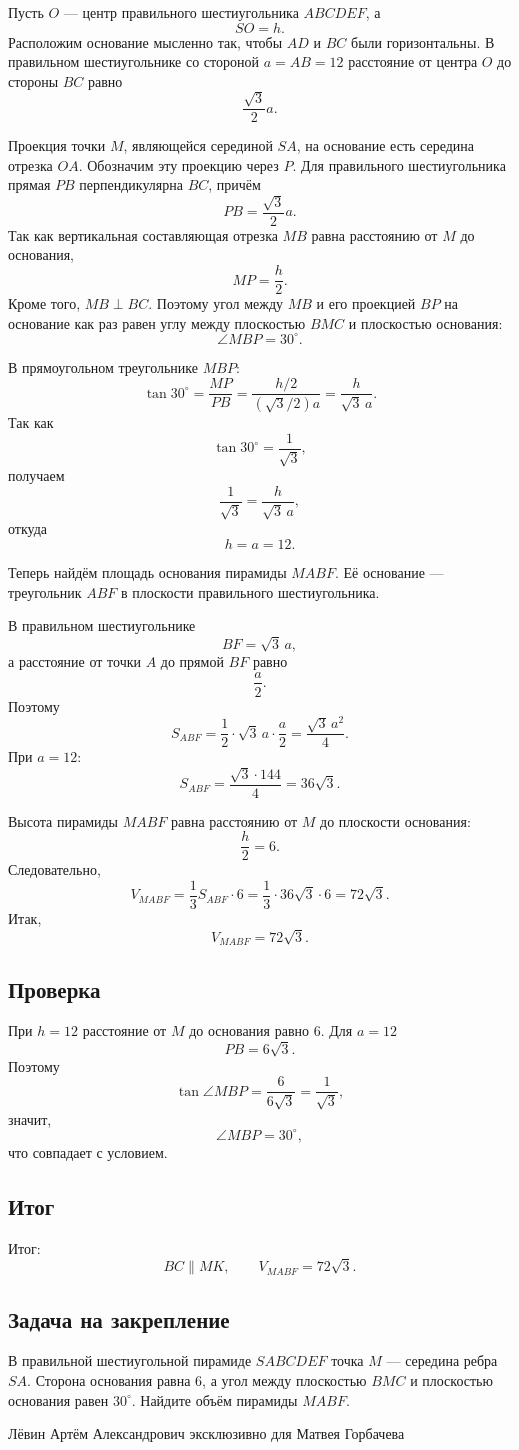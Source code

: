 \documentclass[12pt,a4paper]{article}
\begin{document}
Пусть $O$ --- центр правильного шестиугольника $ABCDEF$, а
\[
SO=h.
\]
Расположим основание мысленно так, чтобы $AD$ и $BC$ были горизонтальны. В правильном шестиугольнике со стороной $a=AB=12$ расстояние от центра $O$ до стороны $BC$ равно
\[
\frac{\sqrt3}{2}a.
\]

Проекция точки $M$, являющейся серединой $SA$, на основание есть середина отрезка $OA$. Обозначим эту проекцию через $P$. Для правильного шестиугольника прямая $PB$ перпендикулярна $BC$, причём
\[
PB=\frac{\sqrt3}{2}a.
\]
Так как вертикальная составляющая отрезка $MB$ равна расстоянию от $M$ до основания,
\[
MP=\frac h2.
\]
Кроме того, $MB\perp BC$. Поэтому угол между $MB$ и его проекцией $BP$ на основание как раз равен углу между плоскостью $BMC$ и плоскостью основания:
\[
\angle MBP=30^\circ.
\]

В прямоугольном треугольнике $MBP$:
\[
\tan30^\circ=\frac{MP}{PB}
=
\frac{h/2}{(\sqrt3/2)a}
=
\frac{h}{\sqrt3\,a}.
\]
Так как
\[
\tan30^\circ=\frac1{\sqrt3},
\]
получаем
\[
\frac1{\sqrt3}=\frac{h}{\sqrt3\,a},
\]
откуда
\[
h=a=12.
\]

Теперь найдём площадь основания пирамиды $MABF$. Её основание --- треугольник $ABF$ в плоскости правильного шестиугольника.

В правильном шестиугольнике
\[
BF=\sqrt3\,a,
\]
а расстояние от точки $A$ до прямой $BF$ равно
\[
\frac a2.
\]
Поэтому
\[
S_{ABF}
=
\frac12\cdot \sqrt3\,a\cdot\frac a2
=
\frac{\sqrt3\,a^2}{4}.
\]
При $a=12$:
\[
S_{ABF}
=
\frac{\sqrt3\cdot144}{4}
=
36\sqrt3.
\]

Высота пирамиды $MABF$ равна расстоянию от $M$ до плоскости основания:
\[
\frac h2=6.
\]
Следовательно,
\[
V_{MABF}
=
\frac13 S_{ABF}\cdot6
=
\frac13\cdot36\sqrt3\cdot6
=
72\sqrt3.
\]
Итак,
\[
\boxed{V_{MABF}=72\sqrt3}.
\]

\subsection*{Проверка}
При $h=12$ расстояние от $M$ до основания равно $6$. Для $a=12$
\[
PB=6\sqrt3.
\]
Поэтому
\[
\tan\angle MBP=\frac{6}{6\sqrt3}=\frac1{\sqrt3},
\]
значит,
\[
\angle MBP=30^\circ,
\]
что совпадает с условием.

\subsection*{Итог}
\textcolor{teal!60!black}{Итог:}
\[
BC\parallel MK,
\qquad
V_{MABF}=72\sqrt3.
\]

\subsection*{Задача на закрепление}
В правильной шестиугольной пирамиде $SABCDEF$ точка $M$ --- середина ребра $SA$. Сторона основания равна $6$, а угол между плоскостью $BMC$ и плоскостью основания равен $30^\circ$. Найдите объём пирамиды $MABF$.

\vfill
\begin{center}
\small
Лёвин Артём Александрович эксклюзивно для Матвея Горбачева
\end{center}
\end{document}

